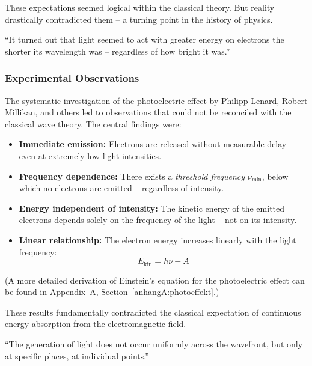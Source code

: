 These expectations seemed logical within the classical theory. But reality drastically contradicted them – a turning point in the history of physics.

\vspace{1em}
\begin{tcolorbox}[physikbox, title=Philipp Lenard (1902)\textit{ \cite{lenard1902} }]
	\label{box:Philipp Lenhard}
	
	\small
	“It turned out that light seemed to act with greater energy on electrons the shorter its wavelength was – regardless of how bright it was.”
\end{tcolorbox}

\subsubsection{Experimental Observations}

The systematic investigation of the photoelectric effect by Philipp Lenard, Robert Millikan, and others led to observations that could not be reconciled with the classical wave theory. The central findings were:

\begin{itemize}
	\item \textbf{Immediate emission:} Electrons are released without measurable delay – even at extremely low light intensities.
	\item \textbf{Frequency dependence:} There exists a \emph{threshold frequency} \( \nu_{\text{min}} \), below which no electrons are emitted – regardless of intensity.
	\item \textbf{Energy independent of intensity:} The kinetic energy of the emitted electrons depends solely on the frequency of the light – not on its intensity.
	\item \textbf{Linear relationship:} The electron energy increases linearly with the light frequency:
	\[
	E_{\text{kin}} = h \nu - A
	\]
\end{itemize}
(A more detailed derivation of Einstein’s equation for the photoelectric effect can be found in Appendix~A, Section~\ref{anhangA:photoeffekt}.)

These results fundamentally contradicted the classical expectation of continuous energy absorption from the electromagnetic field.

\vspace{1em}
\begin{tcolorbox}[physikbox, title=Albert Einstein (1905)\textit{ \cite{einstein1905}}]
	\label{die Erzeuguung von Licht}
	\small
	“The generation of light does not occur uniformly across the wavefront, but only at specific places, at individual points.”
\end{tcolorbox}

